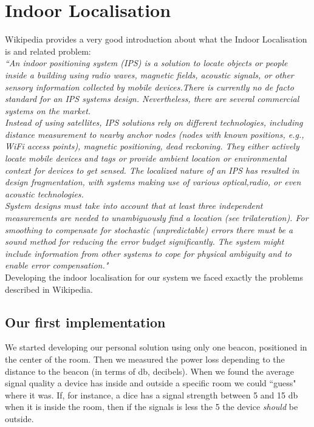 \section{Indoor Localisation}\label{IndoorLocalisation}\label{indoorlocalisation}
Wikipedia provides a very good introduction about what the Indoor Localisation is and related problem:\\

\emph{``An indoor positioning system (IPS) is a solution to locate objects or people inside a building using radio waves, magnetic fields, acoustic signals, or other sensory information collected by mobile devices.There is currently no de facto standard for an IPS systems design. Nevertheless, there are several commercial systems on the market.}\\

\emph{Instead of using satellites, IPS solutions rely on different technologies, including distance measurement to nearby anchor nodes (nodes with known positions, e.g., WiFi access points), magnetic positioning, dead reckoning. They either actively locate mobile devices and tags or provide ambient location or environmental context for devices to get sensed. The localized nature of an IPS has resulted in design fragmentation, with systems making use of various optical,radio, or even acoustic technologies.}\\

\emph{System designs must take into account that at least three independent measurements are needed to unambiguously find a location (see trilateration). For smoothing to compensate for stochastic (unpredictable) errors there must be a sound method for reducing the error budget significantly. The system might include information from other systems to cope for physical ambiguity and to enable error compensation."}\\

Developing the indoor localisation for our system we faced exactly the problems described in Wikipedia.\\

\subsection{Our first implementation}

We started developing our personal solution using only one beacon, positioned in the center of the room. Then we measured the power loss depending to the distance to the beacon (in terms of db, decibels). When we found the average signal quality a device has inside and outside a specific room we could ``guess" where it was. If, for instance, a dice has a signal strength between 5 and 15 db when it is inside the room, then if the signals is less the 5 the device \emph{should} be outside.\\

